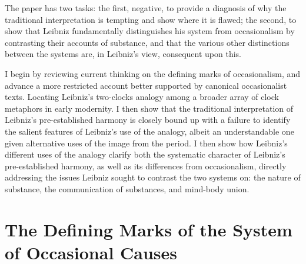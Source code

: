 \documentclass{article}
\begin{document}
The paper has two tasks: the first, negative, to provide a diagnosis of why the traditional interpretation is tempting and show where it is flawed; the second, to show that Leibniz fundamentally distinguishes his system from occasionalism by contrasting their accounts of substance, and that the various other distinctions between the systems are, in Leibniz's view, consequent upon this.


I begin by reviewing current thinking on the defining marks of occasionalism, and advance a more restricted account better supported by canonical occasionalist texts. Locating Leibniz's two-clocks analogy among a broader array of clock metaphors in early modernity. I then show that the traditional interpretation of Leibniz's pre-established harmony is closely bound up with a failure to identify the salient features of Leibniz's use of the analogy, albeit an understandable one given alternative uses of the image from the period. I then show how Leibniz's different uses of the analogy clarify both the systematic character of Leibniz's pre-established harmony, as well as its differences from occasionalism, directly addressing the issues Leibniz sought to contrast the two systems on: the nature of substance, the communication of substances, and mind-body union.

\section{The Defining Marks of the System of Occasional
Causes}
\end{document}
